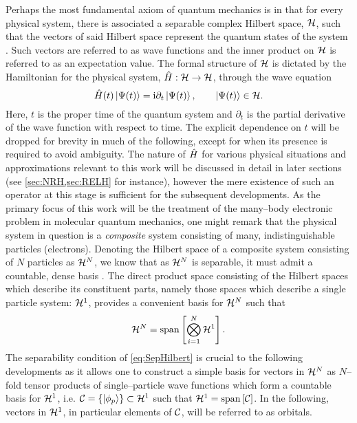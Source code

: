 Perhaps the most fundamental axiom of quantum mechanics is in that for every physical
system, there is associated a separable complex Hilbert space, $\mathcal{H}$, such that
the vectors of said Hilbert space represent the quantum states 
of the system \cite{VonNeumann55_book}. Such vectors are referred to as wave functions
and the inner product on $\mathcal{H}$ is referred to as an expectation value.
The formal structure of $\mathcal{H}$ is dictated by the Hamiltonian
for the physical system, $\hat{H} : \mathcal{H} \rightarrow \mathcal{H}$, through the wave equation
\begin{equation}
  \label{eq:QWave}
\hat{H}(t) \left\vert \Psi(t) \right\rangle = \mathrm i \partial_t \left\vert \Psi(t) \right\rangle, 
  \qquad \left\vert \Psi(t) \right\rangle \in \mathcal{H}.
\end{equation}
Here, $t$ is the proper time of the quantum system and $\partial_t$ is the partial derivative
of the wave function with respect to time. The explicit dependence on $t$ will be dropped
for brevity in much of the following, except for when its presence is required to
avoid ambiguity.
The nature of $\hat{H}$ for various physical situations and approximations relevant
to this work will be discussed in detail in later sections 
(see \cref{sec:NRH,sec:RELH} for instance), however the mere existence of such
an operator at this stage is sufficient for the subsequent developments.
As the primary focus of this work will be the treatment of the many--body electronic
problem in molecular quantum mechanics, one might remark that the physical system
in question is a \emph{composite} system consisting of many, indistinguishable 
particles (electrons). Denoting the Hilbert space of a composite system consisting
of $N$ particles as $\mathcal{H}^N$, we know that as $\mathcal{H}^N$ is separable,
it must admit a countable, dense basis \cite{Lee03_book}.
The direct product space consisting of the Hilbert spaces
which describe its constituent parts, namely those spaces which describe a
single particle system: $\mathcal{H}^1$, provides a convenient basis for $\mathcal{H}^N$ such that
\begin{equation}
  \label{eq:SepHilbert}
  \mathcal{H}^N = \mathrm{span}\left[ \bigotimes_{i = 1}^N \mathcal{H}^1 \right].
\end{equation}
The separability condition of \cref{eq:SepHilbert} is crucial to the following developments
as it allows one to construct a simple basis for vectors in $\mathcal{H}^N$
as $N$--fold tensor products of single--particle wave functions which form a countable basis for $\mathcal{H}^1$, 
i.e. $\mathcal{C} = \left \lbrace \left\vert \phi_p \right\rangle \right\rbrace  \subset \mathcal{H}^1$ such that 
$\mathcal{H}^1 = \mathrm{span}\left[ \mathcal{C} \right]$. In the following, vectors in $\mathcal{H}^1$, in particular elements of $\mathcal{C}$,
will be referred to as orbitals.

